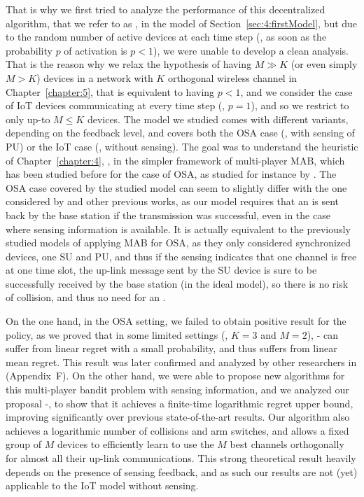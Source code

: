 That is why we first tried to analyze the performance of this decentralized algorithm, that we refer to as \Selfish, in the model of Section~\ref{sec:4:firstModel},
but due to the random number of active devices at each time step (\ie, as soon as the probability $p$ of activation is $p < 1$), we were unable to develop a clean analysis.
%
That is the reason why we relax the hypothesis of having $M \gg K$ (or even simply $M > K$) devices in a network with $K$ orthogonal wireless channel in Chapter~\ref{chapter:5}, that is equivalent to having $p < 1$, and we consider the case of IoT devices communicating at every time step (\ie, $p=1$), and so we restrict to only up-to $M \leq K$ devices.
The model we studied comes with different variants, depending on the feedback level, and covers both the OSA case (\ie, with sensing of PU) or the IoT case (\ie, without sensing).
The goal was to understand the heuristic of Chapter~\ref{chapter:4}, \Selfish, in the simpler framework of multi-player MAB, which has been studied before for the case of OSA, as studied for instance by \cite{Zhao10,Anandkumar10,Anandkumar11}.
%
The OSA case covered by the studied model can seem to slightly differ with the one considered by \cite{Jouini10} and other previous works,
as our model requires that an \Ack{} is sent back by the base station if the transmission was successful, even in the case where sensing information is available.
It is actually equivalent to the previously studied models of applying MAB for OSA, as they only considered synchronized devices, one SU and PU, and thus if the sensing indicates that one channel is free at one time slot, the up-link message sent by the SU device is sure to be successfully received by the base station (in the ideal model), so there is no risk of collision, and thus no need for an \Ack.


On the one hand, in the OSA setting, we failed to obtain positive result for the \Selfish{} policy, as we proved that in some limited settings (\eg, $K=3$ and $M=2$), \Selfish-\UCB{} can suffer from linear regret with a small probability, and thus suffers from linear mean regret.
This result was later confirmed and analyzed by other researchers in \cite{BoursierPerchet18} (Appendix~F).
%
On the other hand, we were able to propose new algorithms for this multi-player bandit problem with sensing information, and we analyzed our proposal \MCTopM-\klUCB, to show that it achieves a finite-time logarithmic regret upper bound, improving significantly over previous state-of-the-art results.
Our algorithm also achieves a logarithmic number of collisions and arm switches, and allows a fixed group of $M$ devices to efficiently learn to use the $M$ best channels orthogonally for almost all their up-link communications.
%
This strong theoretical result heavily depends on the presence of sensing feedback, and as such our results are not (yet) applicable to the IoT model without sensing.


